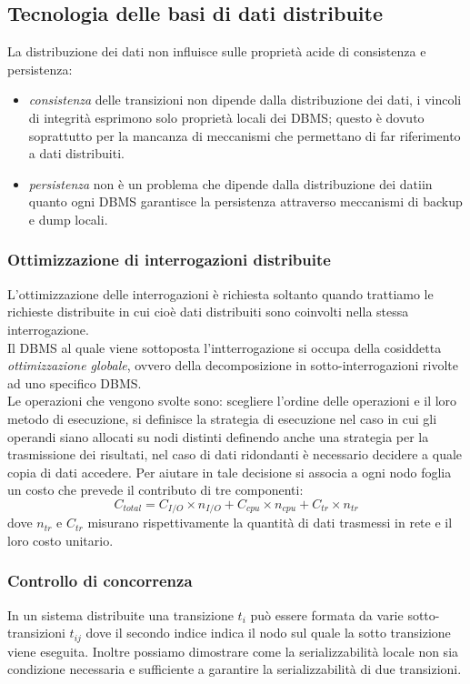 \subsection{Tecnologia delle basi di dati distribuite}
La distribuzione dei dati non influisce sulle proprietà acide di consistenza e persistenza:
\begin{itemize}
\item \emph{consistenza} delle transizioni non dipende dalla distribuzione dei dati, i vincoli di integrità esprimono solo proprietà locali dei DBMS; questo è dovuto soprattutto per la mancanza di meccanismi che permettano di far riferimento a dati distribuiti.
\item \emph{persistenza} non è un problema che dipende dalla distribuzione dei datiin quanto ogni DBMS garantisce la persistenza attraverso meccanismi di backup e dump locali.
\end{itemize}
\subsubsection{Ottimizzazione di interrogazioni distribuite}
L'ottimizzazione delle interrogazioni è richiesta soltanto quando trattiamo le richieste distribuite in cui cioè dati distribuiti sono coinvolti nella stessa interrogazione.\\
Il DBMS al quale viene sottoposta l'intterrogazione si occupa della cosiddetta \emph{ottimizzazione globale}, ovvero della decomposizione in sotto-interrogazioni rivolte ad uno specifico DBMS.\\
Le operazioni che vengono svolte sono: scegliere l'ordine delle operazioni e il loro metodo di esecuzione, si definisce la strategia di esecuzione nel caso in cui gli operandi siano allocati su nodi distinti definendo anche una strategia per la trasmissione dei risultati, nel caso di dati ridondanti è necessario decidere a quale copia di dati accedere. Per aiutare in tale decisione si associa a ogni nodo foglia un costo che prevede il contributo di tre componenti:
$$C_{total} = C_{I/O} \times n_{I/O} + C_{cpu} \times n_{cpu} + C_{tr} \times n_{tr}$$
dove $n_{tr}$ e $C_{tr}$ misurano rispettivamente la quantità di dati trasmessi in rete e il loro costo unitario.
\subsubsection{Controllo di concorrenza}
In un sistema distribuite una transizione $t_i$ può essere formata da varie sotto-transizioni $t_{ij}$ dove il secondo indice indica il nodo sul quale la sotto transizione viene eseguita. Inoltre possiamo dimostrare come la serializzabilità locale non sia condizione necessaria e sufficiente a garantire la serializzabilità di due transizioni.

